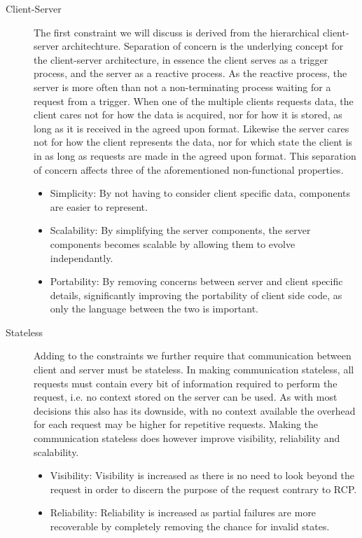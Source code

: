 \begin{description}
    \item [Client-Server\label{client-server-rest}] The first constraint we will discuss is derived from the hierarchical client-server architechture.
    Separation of concern is the underlying concept for the client-server architecture, in essence the client serves as a trigger process, and the server as a reactive process.
    As the reactive process, the server is more often than not a non-terminating process waiting for a request from a trigger.
    When one of the multiple clients requests data, the client cares not for how the data is acquired, nor for how it is stored, as long as it is received in the agreed upon format.
    Likewise the server cares not for how the client represents the data, nor for which state the client is in as long as requests are made in the agreed upon format.
    This separation of concern affects three of the aforementioned non-functional properties.
    \begin{itemize}
        \item Simplicity: By not having to consider client specific data, components are easier to represent.
        \item Scalability: By simplifying the server components, the server components becomes scalable by allowing them to evolve independantly.
        \item Portability: By removing concerns between server and client specific details, significantly improving the portability of client side code, as only the language between the two is important.
    \end{itemize}
    \item [Stateless] Adding to the constraints we further require that communication between client and server must be stateless.
    In making communication stateless, all requests must contain every bit of information required to perform the request, i.e. no context stored on the server can be used.
    As with most decisions this also has its downside, with no context available the overhead for each request may be higher for repetitive requests.
    Making the communication stateless does however improve visibility, reliability and scalability.
    \begin{itemize}
        \item Visibility: Visibility is increased as there is no need to look beyond the request in order to discern the purpose of the request contrary to RCP.
        \item Reliability: Reliability is increased as partial failures are more recoverable by completely removing the chance for invalid states.

\end{itemize}
\end{description}
